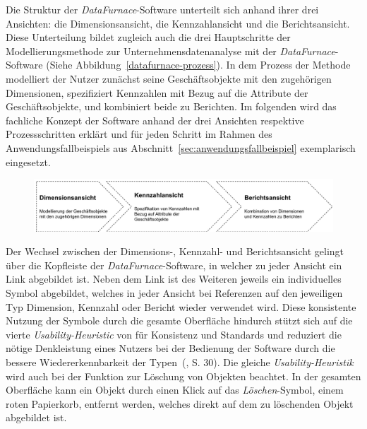 \documentclass[
  language=german, %
  type=bachelor%
]{isthesis}
\begin{document}
\begin{content}
  Die Struktur der \textit{DataFurnace}-Software unterteilt sich anhand ihrer
  drei Ansichten: die Dimensionsansicht, die Kennzahlansicht und die
  Berichtsansicht. Diese Unterteilung bildet zugleich auch die drei
  Hauptschritte der Modellierungsmethode zur Unternehmensdatenanalyse mit der
  \textit{DataFurnace}-Software (Siehe Abbildung~\ref{datafurnace-prozess}). In
  dem Prozess der Methode modelliert der Nutzer zunächst seine Geschäftsobjekte
  mit den zugehörigen Dimensionen, spezifiziert Kennzahlen mit Bezug auf die
  Attribute der Geschäftsobjekte, und kombiniert beide zu Berichten. Im
  folgenden wird das fachliche Konzept der Software anhand der drei Ansichten
  respektive Prozessschritten erklärt und für jeden Schritt im Rahmen des
  Anwendungsfallbeispiels aus Abschnitt~\ref{sec:anwendungsfallbeispiel}
  exemplarisch eingesetzt.

  \begin{figure}[caption={\textit{DataFurnace}-Prozess}, label={datafurnace-prozess}]
    \includegraphics[scale=0.60]{content/figures/datafurnace-process}
  \end{figure}

  Der Wechsel zwischen der Dimensions-, Kennzahl- und Berichtsansicht gelingt
  über die Kopfleiste der \textit{DataFurnace}-Software, in welcher zu jeder
  Ansicht ein Link abgebildet ist. Neben dem Link ist des Weiteren jeweils ein
  individuelles Symbol abgebildet, welches in jeder Ansicht bei Referenzen auf
  den jeweiligen Typ Dimension, Kennzahl oder Bericht wieder verwendet wird.
  Diese konsistente Nutzung der Symbole durch die gesamte Oberfläche hindurch
  stützt sich auf die vierte \textit{Usability-Heuristic} von
  \textsc{\citeauthor{nielsen1994heuristic}} für Konsistenz und Standards und
  reduziert die nötige Denkleistung eines Nutzers bei der Bedienung der
  Software durch die bessere Wiedererkennbarkeit der
  Typen~(\citeyear{nielsen1994heuristic}, S. 30).  Die gleiche
  \textit{Usability-Heuristik} wird auch bei der Funktion zur Löschung von
  Objekten beachtet. In der gesamten Oberfläche kann ein Objekt durch einen
  Klick auf das \textit{Löschen}-Symbol, einem roten Papierkorb, entfernt
  werden, welches direkt auf dem zu löschenden Objekt abgebildet ist.



\end{content}
\end{document}
